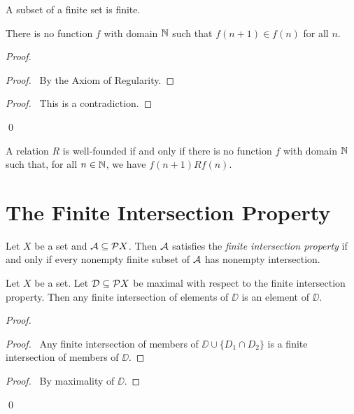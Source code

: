 \begin{corollary}
    A subset of a finite set is finite.
\end{corollary}

\begin{theorem}[Regularity]
    There is no function $f$ with domain $\NN$ such that $f(n+1) \in f(n)$ for all $n$.
\end{theorem}

\begin{proof}
    \pf
    \begin{proof}
        \pf\ By the Axiom of Regularity.
    \end{proof}
    \qedstep
    \begin{proof}
        \pf\ This is a contradiction.
    \end{proof}
    \qed
\end{proof}

\begin{theorem}
    A relation $R$ is well-founded if and only if there is no function $f$ with domain $\NN$
    such that, for all $n \in \NN$, we have $f(n+1) R f(n)$.
\end{theorem}

\section{The Finite Intersection Property}

\begin{definition}
    Let $X$ be a set and $\AA \subseteq \pow X$. Then $\AA$ satisfies the \emph{finite intersection property} if and only if every nonempty finite subset of $\AA$
    has nonempty intersection.
\end{definition}

\begin{lemma}
    \label{lemma:finite_intersection_maximal}
    Let $X$ be a set. Let $\DD \subseteq \pow X$ be maximal with respect to the finite intersection property.
    Then any finite intersection of elements of $\DD$ is an element of $\DD$.
\end{lemma}

\begin{proof}
    \pf
    \begin{proof}
        \pf\ Any finite intersection of members of $\DD \cup \{ D_1 \cap D_2 \}$
        is a finite intersection of members of $\DD$.
    \end{proof}
    \begin{proof}
        \pf\ By maximality of $\DD$.
    \end{proof}
    \qed
\end{proof}

